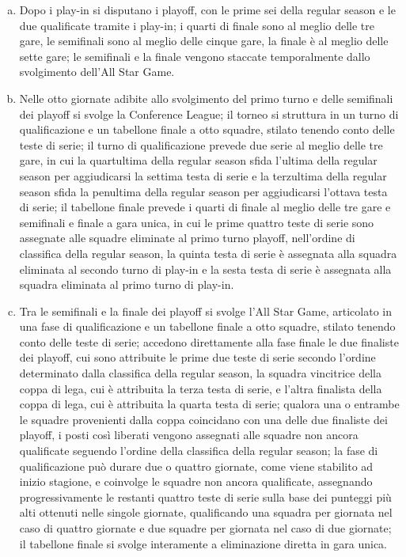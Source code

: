 \documentclass{article}
\begin{document}
\begin{enumerate}[(a)]
\item Dopo i play-in si disputano i playoff, con le prime sei della regular season e le due qualificate tramite i play-in; i quarti di finale sono al meglio delle tre gare, le semifinali sono al meglio delle cinque gare, la finale è al meglio delle sette gare; le semifinali e la finale vengono staccate temporalmente dallo svolgimento dell'All Star Game.
\item Nelle otto giornate adibite allo svolgimento del primo turno e delle semifinali dei playoff si svolge la Conference League; il torneo si struttura in un turno di qualificazione e un tabellone finale a otto squadre, stilato tenendo conto delle teste di serie; il turno di qualificazione prevede due serie al meglio delle tre gare, in cui la quartultima della regular season sfida l'ultima della regular season per aggiudicarsi la settima testa di serie e la terzultima della regular season sfida la penultima della regular season per aggiudicarsi l'ottava testa di serie; il tabellone finale prevede i quarti di finale al meglio delle tre gare e semifinali e finale a gara unica, in cui le prime quattro teste di serie sono assegnate alle squadre eliminate al primo turno playoff, nell'ordine di classifica della regular season, la quinta testa di serie è assegnata alla squadra eliminata al secondo turno di play-in e la sesta testa di serie è assegnata alla squadra eliminata al primo turno di play-in.
\item Tra le semifinali e la finale dei playoff si svolge l'All Star Game, articolato in una fase di qualificazione e un tabellone finale a otto squadre, stilato tenendo conto delle teste di serie; accedono direttamente alla fase finale le due finaliste dei playoff, cui sono attribuite le prime due teste di serie secondo l'ordine determinato dalla classifica della regular season, la squadra vincitrice della coppa di lega, cui è attribuita la terza testa di serie, e l'altra finalista della coppa di lega, cui è attribuita la quarta testa di serie; qualora una o entrambe le squadre provenienti dalla coppa coincidano con una delle due finaliste dei playoff, i posti così liberati vengono assegnati alle squadre non ancora qualificate seguendo l'ordine della classifica della regular season; la fase di qualificazione può durare due o quattro giornate, come viene stabilito ad inizio stagione, e coinvolge le squadre non ancora qualificate, assegnando progressivamente le restanti quattro teste di serie sulla base dei punteggi più alti ottenuti nelle singole giornate, qualificando una squadra per giornata nel caso di quattro giornate e due squadre per giornata nel caso di due giornate; il tabellone finale si svolge interamente a eliminazione diretta in gara unica.

\end{enumerate}
\end{document}

